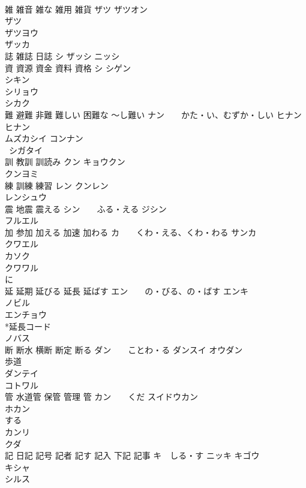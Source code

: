 \documentclass[8pt]{extreport}
\begin{document}
\begin{CJK}{UTF8}{min}
\\	雑 雑音 雑な 雑用 雑貨	ザツ ザツオン 
\\	ザツ 
\\	ザツヨウ 
\\	ザッカ 
\\	誌 雑誌 日誌	シ ザッシ ニッシ 
\\	資 資源 資金 資料 資格	シ シゲン
\\	シキン 
\\	シリョウ 
\\	シカク
\\	難 避難 非難 難しい 困難な 〜し難い	ナン　　かた・い、むずか・しい ヒナン 
\\	ヒナン 
\\	ムズカシイ コンナン 
\\	~シガタイ 
\\	訓 教訓 訓読み	クン キョウクン 
\\	クンヨミ 
\\	練 訓練 練習	レン クンレン 
\\	レンシュウ 
\\	震 地震 震える	シン　　ふる・える ジシン 
\\	フルエル 
\\	加 参加 加える 加速 加わる	カ　　くわ・える、くわ・わる サンカ 
\\	クワエル 
\\	カソク 
\\	クワワル 
\\	に
\\	延 延期 延びる 延長 延ばす	エン　　の・びる、の・ばす エンキ 
\\	ノビル 
\\	エンチョウ 
\\	*延長コード 
\\	ノバス 
\\	断 断水 横断 断定 断る	ダン　　ことわ・る ダンスイ オウダン
\\	歩道 
\\	ダンテイ
\\	コトワル
\\	管 水道管 保管 管理 管	カン　　くだ スイドウカン 
\\	ホカン 
\\	する
\\	カンリ 
\\	クダ 
\\	記 日記 記号 記者 記す 記入 下記 記事	キ　しる・す ニッキ キゴウ 
\\	キシャ 
\\	シルス 

\end{CJK}
\end{document}
